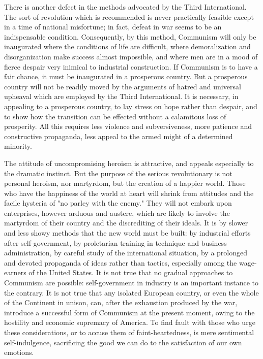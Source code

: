 There is another defect in the methods advocated by the Third International. The sort of revolution which is recommended is never practically feasible except in a time of national misfortune; in fact, defeat in war seems to be an indispensable condition. Consequently, by this method, Communism will only be inaugurated where the conditions of life are difficult, where demoralization and disorganization make success almost impossible, and where men are in a mood of fierce despair very inimical to industrial construction. If Communism is to have a fair chance, it must be inaugurated in a prosperous country. But a prosperous country will not be readily moved by the arguments of hatred and universal upheaval which are employed by the Third International. It is necessary, in appealing to a prosperous country, to lay stress on hope rather than despair, and to show how the transition can be effected without a calamitous loss of prosperity. All this requires less violence and subversiveness, more patience and constructive propaganda, less appeal to the armed might of a determined minority.

The attitude of uncompromising heroism is attractive, and appeals especially to the dramatic instinct. But the purpose of the serious revolutionary is not personal heroism, nor martyrdom, but the creation of a happier world. Those who have the happiness of the world at heart will shrink from attitudes and the facile hysteria of "no parley with the enemy." They will not embark upon enterprises, however arduous and austere, which are likely to involve the martyrdom of their country and the discrediting of their ideals. It is by slower and less showy methods that the new world must be built: by industrial efforts after self-government, by proletarian training in technique and business administration, by careful study of the international situation, by a prolonged and devoted propaganda of ideas rather than tactics, especially among the wage-earners of the United States. It is not true that no gradual approaches to Communism are possible: self-government in industry is an important instance to the contrary. It is not true that any isolated European country, or even the whole of the Continent in unison, can, after the exhaustion produced by the war, introduce a successful form of Communism at the present moment, owing to the hostility and economic supremacy of America. To find fault with those who urge these considerations, or to accuse them of faint-heartedness, is mere sentimental self-indulgence, sacrificing the good we can do to the satisfaction of our own emotions.

